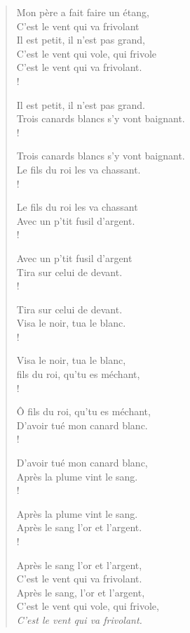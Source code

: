 \documentclass[french,twoside]{book} %
\begin{document}
\begin{verse}
Mon père a fait faire un étang,\\
C’est le vent qui va frivolant\\
Il est petit, il n’est pas grand,\\
C’est le vent qui vole, qui frivole\\
C’est le vent qui va frivolant.\\!

Il est petit, il n’est pas grand.\\
Trois canards blancs s’y vont baignant.\\!

Trois canards blancs s’y vont baignant.\\
Le fils du roi les va chassant.\\!

Le fils du roi les va chassant\\
Avec un p’tit fusil d’argent.\\!

Avec un p’tit fusil d’argent\\
Tira sur celui de devant.\\!

Tira sur celui de devant.\\
Visa le noir, tua le blanc.\\!

Visa le noir, tua le blanc,\\
fils du roi, qu’tu es méchant,\\!

Ô fils du roi, qu’tu es méchant,\\
D’avoir tué mon canard blanc.\\!

D’avoir tué mon canard blanc,\\
Après la plume vint le sang.\\!

Après la plume vint le sang.\\
Après le sang l’or et l’argent.\\!

Après le sang l’or et l’argent,\\
C’est le vent qui va frivolant.\\
Après le sang, l’or et l’argent,\\
C’est le vent qui vole, qui frivole,\\
{\itshape C’est le vent qui va frivolant.}\\
\end{verse}
\end{document}

